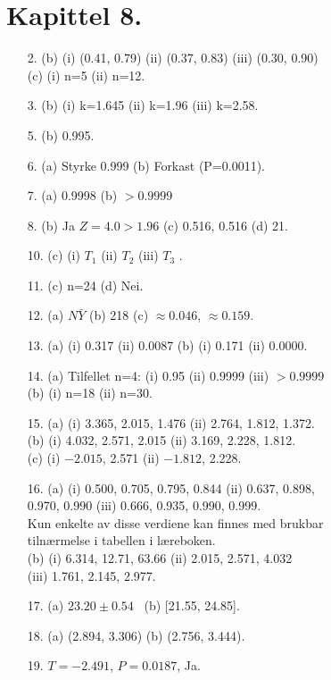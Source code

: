 \section*{Kapittel 8.}
\begin{itemize}         
\item[2.]  (b) (i) (0.41, 0.79)  (ii) (0.37, 0.83)  (iii) (0.30, 0.90)\\
              (c) (i) n=5  (ii) n=12.
\item[3.]  (b) (i) k=1.645   (ii) k=1.96   (iii) k=2.58.
\item[5.]  (b) 0.995.
\item[6.]  (a) Styrke 0.999   (b) Forkast (P=0.0011).
\item[7.]  (a) 0.9998   (b) $> 0.9999$
\item[8.]  (b) Ja $Z=4.0 > 1.96$   (c) 0.516, 0.516   (d) 21.
\item[10.]  (c) (i) $T_1$   (ii) $T_2$    (iii) $T_3$ .
\item[11.]  (c) n=24   (d) Nei.
\item[12.]  (a) $N\bar{Y}$   (b) 218   (c) $\approx 0.046$,  $\approx 0.159$.
\item[13.]  (a) (i) 0.317  (ii) 0.0087   (b) (i) 0.171  (ii) 0.0000.
\item[14.]  (a) Tilfellet n=4:  (i) 0.95  (ii) 0.9999  (iii) $> 0.9999$\\
              (b) (i) n=18   (ii) n=30.
\item[15.]  (a) (i) 3.365, 2.015, 1.476  (ii) 2.764, 1.812, 1.372.\\
              (b) (i) 4.032, 2.571, 2.015  (ii) 3.169, 2.228, 1.812.\\
              (c) (i) $-2.015$, 2.571   (ii) $-1.812$, 2.228.
\item[16.]  (a) (i) 0.500, 0.705, 0.795, 0.844  (ii) 0.637, 0.898,\\
              0.970, 0.990   (iii) 0.666, 0.935, 0.990, 0.999.\\
              Kun enkelte av disse verdiene kan finnes med brukbar \\
              tilnærmelse i tabellen i læreboken.\\
              (b) (i) 6.314, 12.71, 63.66   (ii) 2.015, 2.571, 4.032\\
              (iii) 1.761, 2.145, 2.977.
\item[17.]   (a) $23.20 \pm 0.54$  \ (b) [21.55, 24.85].
\item[18.]  (a) (2.894, 3.306)   (b) (2.756, 3.444).
\item[19.]  $T=-2.491$,  $P=0.0187$,  Ja.

\end{itemize}
